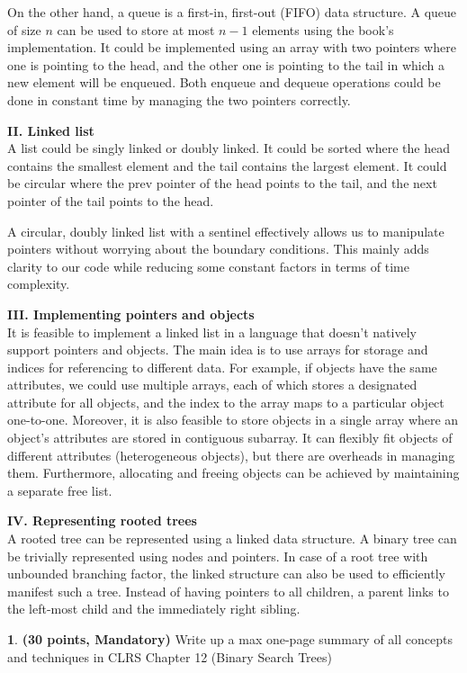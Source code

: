 \documentclass[11pt]{article}
\theoremstyle{definition}
\theoremstyle{theorem}
\newtheorem{prob}{}
\begin{document}
On the other hand, a queue is a first-in, first-out (FIFO) data structure. A queue of size $n$ can be used to store at most $n-1$ elements using the book's implementation. It could be implemented using an array with two pointers where one is pointing to the head, and the other one is pointing to the tail in which a new element will be enqueued. Both enqueue and dequeue operations could be done in constant time by managing the two pointers correctly.

\textbf{II. Linked list} \\
A list could be singly linked or doubly linked. It could be sorted where the head contains the smallest element and the tail contains the largest element. It could be circular where the prev pointer of the head points to the tail, and the next pointer of the tail points to the head. 

A circular, doubly linked list with a sentinel effectively allows us to manipulate pointers without worrying about the boundary conditions.  This mainly adds clarity to our code while reducing some constant factors in terms of time complexity. 

\textbf{III. Implementing pointers and objects} \\
It is feasible to implement a linked list in a language that doesn’t natively support pointers and objects. The main idea is to use arrays for storage and indices for referencing to different data. For example, if objects have the same attributes, we could use multiple arrays, each of which stores a designated attribute for all objects, and the index to the array maps to a particular object one-to-one. Moreover, it is also feasible to store objects in a single array where an object’s attributes are stored in contiguous subarray. It can flexibly fit objects of different attributes (heterogeneous objects), but there are overheads in managing them. Furthermore, allocating and freeing objects can be achieved by maintaining a separate free list. 

\textbf{IV. Representing rooted trees} \\
A rooted tree can be represented using a linked data structure. A binary tree can be trivially represented using nodes and pointers. In case of a root tree with unbounded branching factor, the linked structure can also be used to efficiently manifest such a tree. Instead of having pointers to all children, a parent links to the left-most child and the immediately right sibling. 


\newpage
\begin{prob} \textbf{(30 points, Mandatory)} Write up a max one-page summary of all concepts and techniques in CLRS Chapter 12 (Binary Search Trees)
\end{prob}
\end{document}
